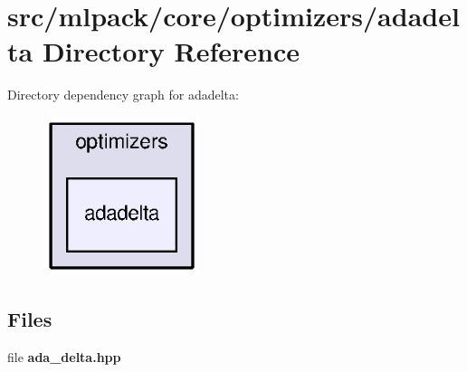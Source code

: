 \section{src/mlpack/core/optimizers/adadelta Directory Reference}
\label{dir_d97efbb231ca91939918f07f71c16817}
Directory dependency graph for adadelta\+:
\nopagebreak
\begin{figure}[H]
\begin{center}
\leavevmode
\includegraphics[width=130pt]{dir_d97efbb231ca91939918f07f71c16817_dep}
\end{center}
\end{figure}
\subsection*{Files}
\begin{DoxyCompactItemize}
\item 
file {\bf ada\+\_\+delta.\+hpp}
\end{DoxyCompactItemize}

